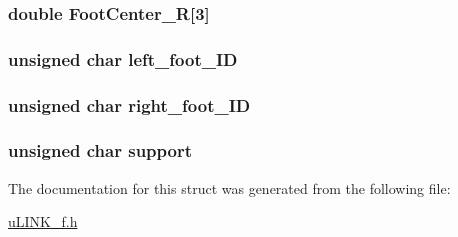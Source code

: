 \hypertarget{struct_struct___state_a20b8e13992b9546e13ab927985c08783}{
\subsubsection[{Foot\-Center\-\_\-\-R}]{\setlength{\rightskip}{0pt plus 5cm}double Foot\-Center\-\_\-\-R\mbox{[}3\mbox{]}}}\label{struct_struct___state_a20b8e13992b9546e13ab927985c08783}
\hypertarget{struct_struct___state_a59c50a3f7e85d2d8935b0cc17b246def}{
\subsubsection[{left\-\_\-foot\-\_\-\-I\-D}]{\setlength{\rightskip}{0pt plus 5cm}unsigned char left\-\_\-foot\-\_\-\-I\-D}}\label{struct_struct___state_a59c50a3f7e85d2d8935b0cc17b246def}
\hypertarget{struct_struct___state_a6464c8fa37c44fd32cad38d5bfb8dc63}{
\subsubsection[{right\-\_\-foot\-\_\-\-I\-D}]{\setlength{\rightskip}{0pt plus 5cm}unsigned char right\-\_\-foot\-\_\-\-I\-D}}\label{struct_struct___state_a6464c8fa37c44fd32cad38d5bfb8dc63}
\hypertarget{struct_struct___state_a9854989348fe32143c3c0bae57d2d21f}{
\subsubsection[{support}]{\setlength{\rightskip}{0pt plus 5cm}unsigned char support}}\label{struct_struct___state_a9854989348fe32143c3c0bae57d2d21f}


The documentation for this struct was generated from the following file\-:\begin{DoxyCompactItemize}
\item 
\hyperlink{u_l_i_n_k__f_8h}{u\-L\-I\-N\-K\-\_\-f.\-h}\end{DoxyCompactItemize}
